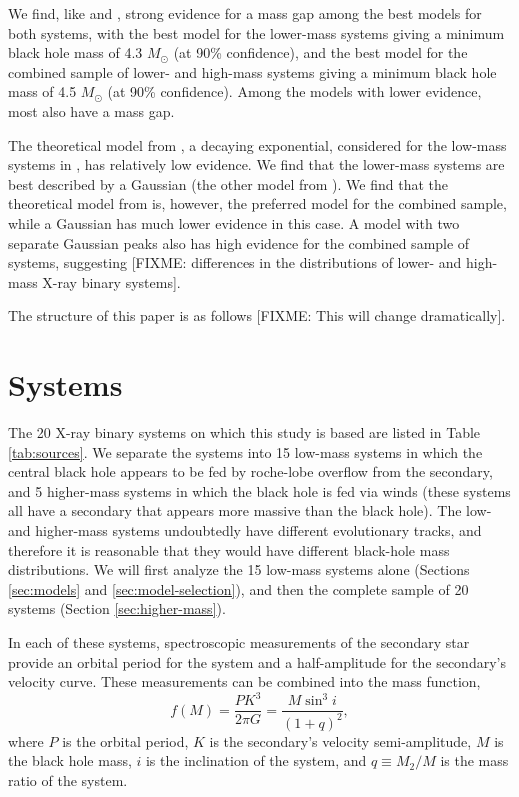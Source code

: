 \documentclass[preprint]{aastex}
\newcommand{\fixme}[1]{[FIXME: #1]}
\newcommand{\Msun}{M_\odot}
\begin{document}
We find, like \citet{Ozel2010} and \citet{Bailyn1998}, strong evidence
for a mass gap among the best models for both systems, with the best
model for the lower-mass systems giving a minimum black hole mass of
4.3 $\Msun$ (at 90\% confidence), and the best model for the combined
sample of lower- and high-mass systems giving a minimum black hole
mass of 4.5 $\Msun$ (at 90\% confidence).  Among the models with lower
evidence, most also have a mass gap.

The theoretical model from \citet{Fryer2001}, a decaying exponential,
considered for the low-mass systems in \citet{Ozel2010}, has
relatively low evidence.  We find that the lower-mass systems are best
described by a Gaussian (the other model from \citet{Ozel2010}).  We
find that the theoretical model from \citet{Fryer2001} is, however,
the preferred model for the combined sample, while a Gaussian has much
lower evidence in this case.  A model with two separate Gaussian peaks
also has high evidence for the combined sample of systems, suggesting
\fixme{differences in the distributions of lower- and high-mass X-ray
  binary systems}.

The structure of this paper is as follows \fixme{This will change
  dramatically}.


\section{Systems}
\label{sec:systems}

The 20 X-ray binary systems on which this study is based are listed in
Table \ref{tab:sources}.  We separate the systems into 15 low-mass
systems in which the central black hole appears to be fed by
roche-lobe overflow from the secondary, and 5 higher-mass systems in
which the black hole is fed via winds (these systems all have a
secondary that appears more massive than the black hole).  The low-
and higher-mass systems undoubtedly have different evolutionary
tracks, and therefore it is reasonable that they would have different
black-hole mass distributions.  We will first analyze the 15 low-mass
systems alone (Sections \ref{sec:models} and
\ref{sec:model-selection}), and then the complete sample of 20 systems
(Section \ref{sec:higher-mass}).

In each of these systems, spectroscopic measurements of the secondary
star provide an orbital period for the system and a half-amplitude for
the secondary's velocity curve.  These measurements can be combined
into the mass function,
\begin{equation}
  \label{eq:mass-function}
  f(M) = \frac{P K^3}{2\pi G} = \frac{M \sin^3 i}{\left( 1 + q \right)^2},
\end{equation}
where $P$ is the orbital period, $K$ is the secondary's velocity
semi-amplitude, $M$ is the black hole mass, $i$ is the inclination of
the system, and $q \equiv M_2 / M$ is the mass ratio of the system.
\end{document}

